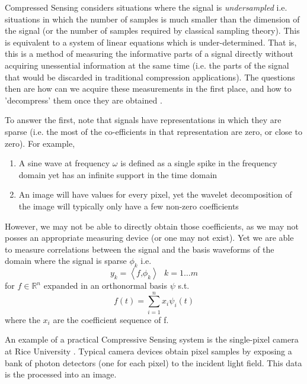 \documentclass[conference]{IEEEtran}
\begin{document}
Compressed Sensing considers situations where the signal is \textit{undersampled} i.e. situations in which the number of samples is much smaller than the dimension of the signal (or the number of samples required by classical sampling theory). This is equivalent to a system of linear equations which is under-determined.  That is, this is a method of measuring the informative parts of a signal directly without acquiring unessential information at the same time (i.e. the parts of the signal that would be discarded in traditional compression applications). The questions then are how can we acquire these measurements in the first place, and how to 'decompress' them once they are obtained \cite{Donoho2006}. 

To answer the first, note that signals have representations in which they are sparse (i.e. the most of the co-efficients in that representation are zero, or close to zero). For example, 

\begin{enumerate}
\item  A sine wave at frequency \(\omega\) is defined as a single spike in the frequency domain yet has an infinite support in the time domain
\item An image will have values for every pixel, yet the wavelet decomposition of the image will typically only have a few non-zero coefficients
\end{enumerate} 

However, we may not be able to directly obtain those coefficients, as we may not posses an appropriate measuring device (or one may not exist). Yet we are able to measure correlations between the signal and the basis waveforms of the domain where the signal is sparse \(\phi_{k}\) i.e. 
%
\begin{equation}
y_{k} = \left\langle f \text{,} \phi_{k} \right\rangle \text{ } k = 1 \ldots m
\end{equation}
%
for \( f \in \mathbb{R}^n \) expanded in an orthonormal basis \( \psi \) s.t.
%
\begin{equation}
f(t) = \sum_{i = 1}^n x_{i}\psi_{i}(t) 
\end{equation}
%
where the \(x_{i} \) are the coefficient sequence of f. 

An example of a practical Compressive Sensing system is the single-pixel camera at Rice University \cite{Duarte2008}. Typical camera devices obtain pixel samples by exposing a bank of photon detectors (one for each pixel) to the incident light field. This data is the processed into an image.
\end{document}
